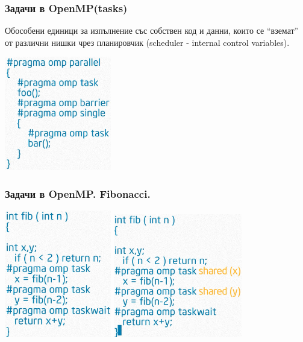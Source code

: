 \documentclass{beamer}
\begin{document}
\begin{frame}
  \frametitle{Задачи в OpenMP(tasks)}
  Обособени единици за изпълнение със собствен код и данни, които се ``вземат'' от различни нишки чрез планировчик (scheduler - internal control variables).

  \centering
  \includegraphics[width=0.35\textwidth]{task}

\end{frame}


\begin{frame}[plain]
  \frametitle{Задачи в OpenMP. Fibonacci.}
  \centering
  \includegraphics[width=0.35\textwidth]{fib}\pause  
  \includegraphics[width=0.42\textwidth]{fib1}  
\end{frame}
\end{document}
